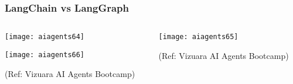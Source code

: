

\begin{frame}[fragile]\frametitle{LangChain vs LangGraph}
\begin{columns}
    \begin{column}[T]{0.6\linewidth}
        \begin{center}
        \texttt{[image: aiagents64]}
		
        \texttt{[image: aiagents66]}
		
		{\tiny (Ref: Vizuara AI Agents Bootcamp)}
				
        \end{center}    
    \end{column}
    \begin{column}[T]{0.4\linewidth}
        \begin{center}
        \texttt{[image: aiagents65]}
		
		{\tiny (Ref: Vizuara AI Agents Bootcamp)}
				
        \end{center}    
    \end{column}
  \end{columns}
\end{frame}


